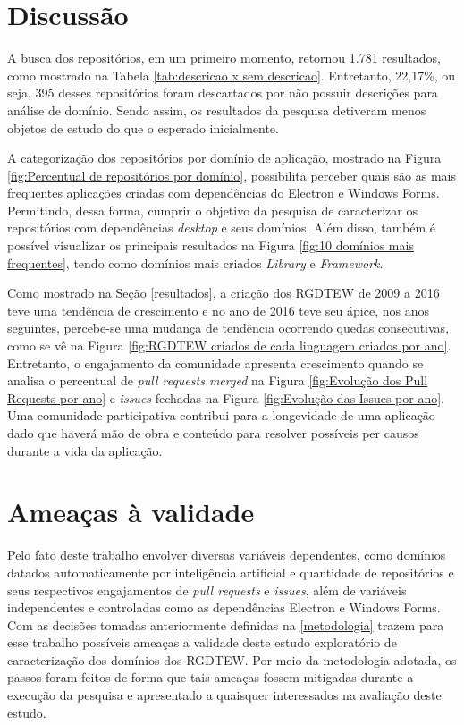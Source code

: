 \documentclass[12pt]{article}
\begin{document}
\section{Discussão} \label{discussao}

A busca dos repositórios, em um primeiro momento, retornou 1.781 resultados, como mostrado na Tabela \ref{tab:descricao x sem descricao}. Entretanto, 22,17\%, ou seja, 395 desses repositórios foram descartados por não possuir descrições para análise de domínio. Sendo assim, os resultados da pesquisa detiveram menos objetos de estudo do que o esperado inicialmente.

A categorização dos repositórios por domínio de aplicação, mostrado na Figura \ref{fig:Percentual de repositórios por domínio}, possibilita perceber quais são as mais frequentes aplicações criadas com  dependências do Electron e Windows Forms. Permitindo, dessa forma, cumprir o objetivo da pesquisa de caracterizar os repositórios com dependências \emph{desktop} e seus domínios. Além disso, também é possível visualizar os principais resultados na Figura \ref{fig:10 domínios mais frequentes}, tendo como domínios mais criados \emph{Library} e \emph{Framework}.

Como mostrado na Seção \ref{resultados}, a criação dos RGDTEW de 2009 a 2016 teve uma tendência de crescimento e no ano de 2016 teve seu ápice, nos anos seguintes, percebe-se uma mudança de tendência ocorrendo quedas consecutivas, como se vê na Figura \ref{fig:RGDTEW criados de cada linguagem criados por ano}. Entretanto, o engajamento da comunidade apresenta crescimento quando se analisa o percentual de \emph{pull requests merged} na Figura \ref{fig:Evolução dos Pull Requests por ano} e \emph{issues} fechadas na Figura \ref{fig:Evolução das Issues por ano}. Uma comunidade participativa contribui para a longevidade de uma aplicação dado que haverá mão de obra e conteúdo para resolver possíveis per causos durante a vida da aplicação.

\section{Ameaças à validade} \label{ameacas}

Pelo fato deste trabalho envolver diversas variáveis dependentes, como domínios datados automaticamente por inteligência artificial e quantidade de repositórios e seus respectivos engajamentos de \textit{pull requests} e \textit{issues}, além de variáveis independentes e controladas como as dependências Electron e Windows Forms. Com as decisões tomadas anteriormente definidas na \ref{metodologia} trazem para esse trabalho possíveis ameaças a validade deste estudo exploratório de caracterização dos domínios dos RGDTEW. Por meio da metodologia adotada, os passos foram feitos de forma que tais ameaças fossem mitigadas durante a execução da pesquisa e apresentado a quaisquer interessados na avaliação deste estudo.
\end{document}
